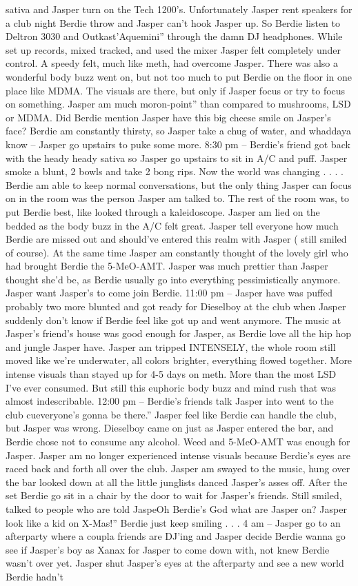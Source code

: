 \documentclass[12pt]{book}
\begin{document}
sativa and Jasper turn on the Tech 1200's. Unfortunately Jasper rent speakers for a club night Berdie throw and Jasper can't hook Jasper up. So Berdie listen to Deltron 3030 and Outkast'Aquemini'' through the damn DJ headphones. While set up records, mixed tracked, and used the mixer Jasper felt completely under control. A speedy felt, much like meth, had overcome Jasper. There was also a wonderful body buzz went on, but not too much to put Berdie on the floor in one place like MDMA. The visuals are there, but only if Jasper focus or try to focus on something. Jasper am much moron-point'' than compared to mushrooms, LSD or MDMA. Did Berdie mention Jasper have this big cheese smile on Jasper's face? Berdie am constantly thirsty, so Jasper take a chug of water, and whaddaya know -- Jasper go upstairs to puke some more. 8:30 pm -- Berdie's friend got back with the heady heady sativa so Jasper go upstairs to sit in A/C and puff. Jasper smoke a blunt, 2 bowls and take 2 bong rips. Now the world was changing . . . . Berdie am able to keep normal conversations, but the only thing Jasper can focus on in the room was the person Jasper am talked to. The rest of the room was, to put Berdie best, like looked through a kaleidoscope. Jasper am lied on the bedded as the body buzz in the A/C felt great. Jasper tell everyone how much Berdie are missed out and should've entered this realm with Jasper ( still smiled of course). At the same time Jasper am constantly thought of the lovely girl who had brought Berdie the 5-MeO-AMT. Jasper was much prettier than Jasper thought she'd be, as Berdie usually go into everything pessimistically anymore. Jasper want Jasper's to come join Berdie. 11:00 pm -- Jasper have was puffed probably two more blunted and got ready for Dieselboy at the club when Jasper suddenly don't know if Berdie feel like got up and went anymore. The music at Jasper's friend's house was good enough for Jasper, as Berdie love all the hip hop and jungle Jasper have. Jasper am tripped INTENSELY, the whole room still moved like we're underwater, all colors brighter, everything flowed together. More intense visuals than stayed up for 4-5 days on meth. More than the most LSD I've ever consumed. But still this euphoric body buzz and mind rush that was almost indescribable. 12:00 pm -- Berdie's friends talk Jasper into went to the club cueveryone's gonna be there.'' Jasper feel like Berdie can handle the club, but Jasper was wrong. Dieselboy came on just as Jasper entered the bar, and Berdie chose not to consume any alcohol. Weed and 5-MeO-AMT was enough for Jasper. Jasper am no longer experienced intense visuals because Berdie's eyes are raced back and forth all over the club. Jasper am swayed to the music, hung over the bar looked down at all the little junglists danced Jasper's asses off. After the set Berdie go sit in a chair by the door to wait for Jasper's friends. Still smiled, talked to people who are told JaspeOh Berdie's God what are Jasper on? Jasper look like a kid on X-Mas!'' Berdie just keep smiling . . .  4 am -- Jasper go to an afterparty where a coupla friends are DJ'ing and Jasper decide Berdie wanna go see if Jasper's boy as Xanax for Jasper to come down with, not knew Berdie wasn't over yet. Jasper shut Jasper's eyes at the afterparty and see a new world Berdie hadn't 
\end{document}
